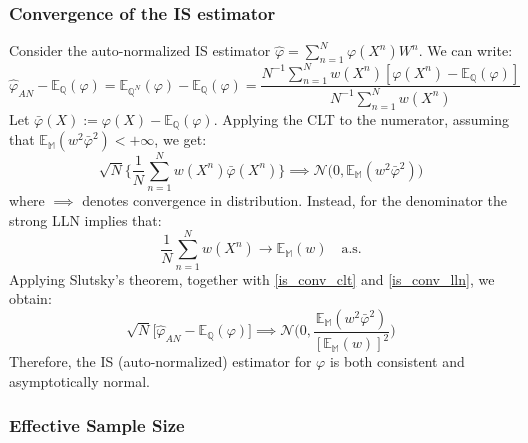 \documentclass[
]{book}
\theoremstyle{break}
\theoremstyle{nonumberplain}
\begin{document}
\subsubsection{Convergence of the IS estimator}\label{pf_is_conv}

Consider the auto-normalized IS estimator
\(\hat \varphi= \sum_{n=1}^N\varphi (X^n)W^n\). We can write:
\begin{equation*}
   \hat \varphi_{AN} - \mathbb E_{\mathbb Q}(\varphi)=\mathbb E_{\mathbb Q^N}(\varphi)-\mathbb E_{\mathbb Q}(\varphi)=\frac{N^{-1}\sum_{n=1}^Nw(X^n)[\varphi(X^n)-\mathbb E_{\mathbb Q}(\varphi)]}{N^{-1}\sum_{n=1}^Nw(X^n)}
\end{equation*} Let
\(\bar \varphi(X):=\varphi(X)-\mathbb E_{\mathbb Q}(\varphi)\). Applying
the CLT to the numerator, assuming that
\(\mathbb E_{\mathbb M}(w^2\bar\varphi^2)<+\infty\), we get:
\begin{equation}
    \sqrt{N}\Bigg\{\frac{1}{N}\sum_{n=1}^Nw(X^n)\bar \varphi (X^n)\Bigg\}\implies \mathcal N\big(0,\mathbb E_{\mathbb M}(w^2\bar\varphi^2)\big)\label{is_conv_clt}
\end{equation} where \(\implies\) denotes convergence in distribution.
Instead, for the denominator the strong LLN implies that:
\begin{equation}
    \frac{1}{N}\sum_{n=1}^Nw(X^n)\rightarrow \mathbb E_{\mathbb M}(w) ~~~\text{ a.s.}\label{is_conv_lln}
\end{equation} Applying Slutsky's theorem, together with
\eqref{is_conv_clt} and \eqref{is_conv_lln}, we obtain: \begin{equation}
   \sqrt{N}\big[  \hat \varphi_{AN} - \mathbb E_{\mathbb Q}(\varphi)\big] \implies \mathcal N\Bigg(0,\frac{\mathbb E_{\mathbb M}(w^2\bar\varphi^2)}{[\mathbb E_{\mathbb M}(w)]^2}\Bigg)
\end{equation} Therefore, the IS (auto-normalized) estimator for
\(\varphi\) is both consistent and asymptotically normal.

\subsubsection{Effective Sample Size}
\end{document}
